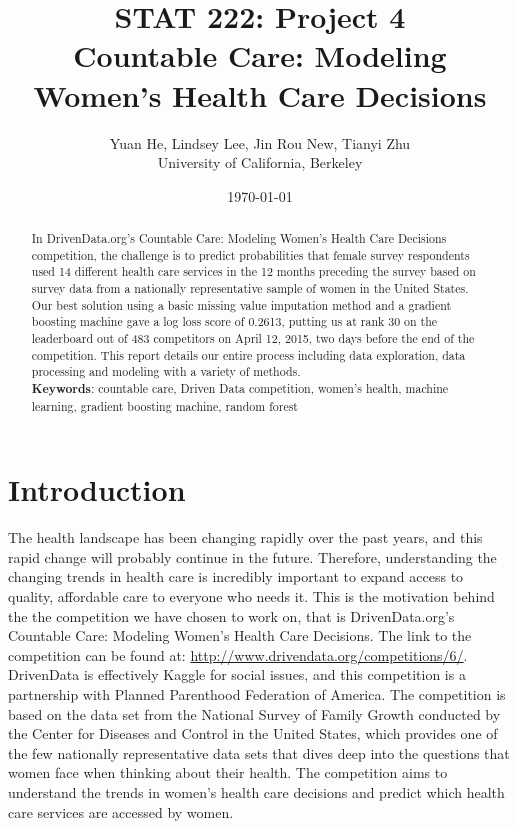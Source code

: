 \documentclass{article}\usepackage[]{graphicx}\usepackage[]{color}
\title{STAT 222: Project 4\\
       Countable Care: Modeling Women's Health Care Decisions}
\author{Yuan He, Lindsey Lee, Jin Rou New, Tianyi Zhu\\
        University of California, Berkeley}
\date{\today}
\begin{document}
\maketitle

\begin{abstract}
  In DrivenData.org's Countable Care: Modeling Women's Health Care Decisions competition, the challenge is to predict probabilities that female survey respondents used 14 different health care services in the 12 months preceding the survey based on survey data from a nationally representative sample of women in the United States. Our best solution using a basic missing value imputation method and a gradient boosting machine gave a log loss score of 0.2613, putting us at rank 30 on the leaderboard out of 483 competitors on April 12, 2015, two days before the end of the competition. This report details our entire process including data exploration, data processing and modeling with a variety of methods. \\ 
	\hfill\break
	\textbf{Keywords}: countable care, Driven Data competition, women's health, machine learning, gradient boosting machine, random forest
\end{abstract}
\clearpage
\section{Introduction}
\label{sec:introduction}
The health landscape has been changing rapidly over the past years, and this rapid change will probably continue in the future. Therefore, understanding the changing trends in health care is incredibly important to expand access to quality, affordable care to everyone who needs it. This is the motivation behind the the competition we have chosen to work on, that is DrivenData.org's Countable Care: Modeling Women's Health Care Decisions. The link to the competition can be found at: \href{http://www.drivendata.org/competitions/6/}{http://www.drivendata.org/competitions/6/}. DrivenData is effectively Kaggle for social issues, and this competition is a partnership with Planned Parenthood Federation of America. The competition is based on the data set from the National Survey of Family Growth conducted by the Center for Diseases and Control in the United States, which provides one of the few nationally representative data sets that dives deep into the questions that women face when thinking about their health. The competition aims to understand the trends in women’s health care decisions and predict which health care services are accessed by women.
\end{document}
